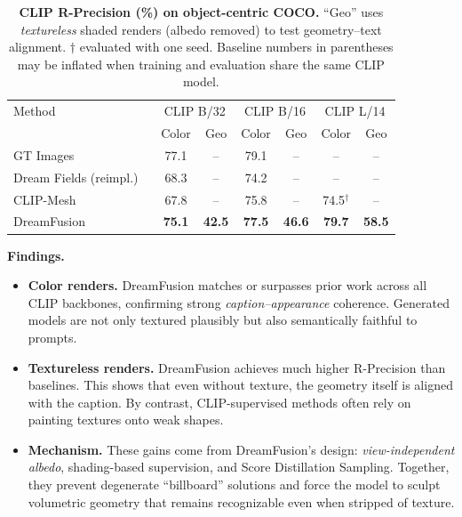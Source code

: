 \begin{enrichment}
\begin{enrichment}
        \begin{table}[H]
            \centering
            \small
            \caption{\textbf{CLIP R-Precision (\%) on object-centric COCO.}
                ``Geo'' uses \emph{textureless} shaded renders (albedo removed) to test geometry–text alignment.
                $\dagger$ evaluated with one seed. Baseline numbers in parentheses may be inflated when training and evaluation share the same CLIP model.}
            \vspace{0.25em}
            \begin{tabular}{lcccccc}
                \toprule
                Method & \multicolumn{2}{c}{CLIP B/32} & \multicolumn{2}{c}{CLIP B/16} & \multicolumn{2}{c}{CLIP L/14} \\
                & Color & Geo & Color & Geo & Color & Geo \\
                \midrule
                GT Images              & 77.1 & --  & 79.1 & --  & --  & -- \\
                Dream Fields (reimpl.) ~\cite{jain2022_dreamfields} & 68.3 & --  & 74.2 & --  & --  & -- \\
                CLIP-Mesh  ~\cite{sanghi2022_clipmesh}             & 67.8 & --  & 75.8 & --  & 74.5$^\dagger$ & -- \\
                DreamFusion            & \textbf{75.1} & \textbf{42.5} & \textbf{77.5} & \textbf{46.6} & \textbf{79.7} & \textbf{58.5} \\
                \bottomrule
            \end{tabular}
            \label{tab:chapter23_dreamfusion_rprec}
        \end{table}
        
        \medskip
        \noindent
        \textbf{Findings.}
        \begin{itemize}
            \item \textbf{Color renders.} DreamFusion matches or surpasses prior work across all CLIP backbones, confirming strong \emph{caption–appearance} coherence. Generated models are not only textured plausibly but also semantically faithful to prompts.  
            \item \textbf{Textureless renders.} DreamFusion achieves much higher R-Precision than baselines. This shows that even without texture, the geometry itself is aligned with the caption. By contrast, CLIP-supervised methods often rely on painting textures onto weak shapes.  
            \item \textbf{Mechanism.} These gains come from DreamFusion’s design: \emph{view-independent albedo}, shading-based supervision, and Score Distillation Sampling. Together, they prevent degenerate “billboard” solutions and force the model to sculpt volumetric geometry that remains recognizable even when stripped of texture.  
        \end{itemize}
        

\end{enrichment}
\end{enrichment}
